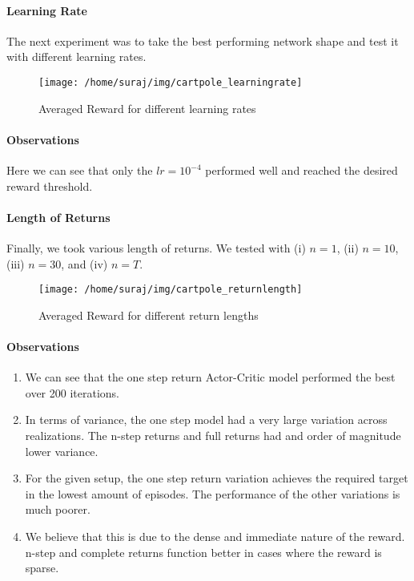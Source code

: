 \documentclass[A4]{article}
\begin{document}
    \paragraph{Learning Rate} The next experiment was to take the best performing network shape and test it with different learning rates.

    \begin{figure}[H]
        \centering
        \texttt{[image: /home/suraj/img/cartpole\_learningrate]}
        \caption{Averaged Reward for different learning rates}
        \label{fig:cartpole_learningrate}
    \end{figure}

    \paragraph{Observations}
    Here we can see that only the $lr=10^{-4}$ performed well and reached the desired reward threshold.

    \paragraph{Length of Returns} Finally, we took various length of returns.
    We tested with (i) $n=1$, (ii) $n=10$, (iii) $n=30$, and (iv) $n=T$.

    \begin{figure}[H]
        \centering
        \texttt{[image: /home/suraj/img/cartpole\_returnlength]}
        \caption{Averaged Reward for different return lengths}
        \label{fig:}
    \end{figure}

    \paragraph{Observations}
    \begin{enumerate}
        \item We can see that the one step return Actor-Critic model performed the best over 200 iterations.
        \item In terms of variance, the one step model had a very large variation across realizations.
        The n-step returns and full returns had and order of magnitude lower variance.
        \item For the given setup, the one step return variation achieves the required target in the lowest amount of episodes.
        The performance of the other variations is much poorer.
        \item We believe that this is due to the dense and immediate nature of the reward.
        n-step and complete returns function better in cases where the reward is sparse.
    \end{enumerate}
\end{document}
